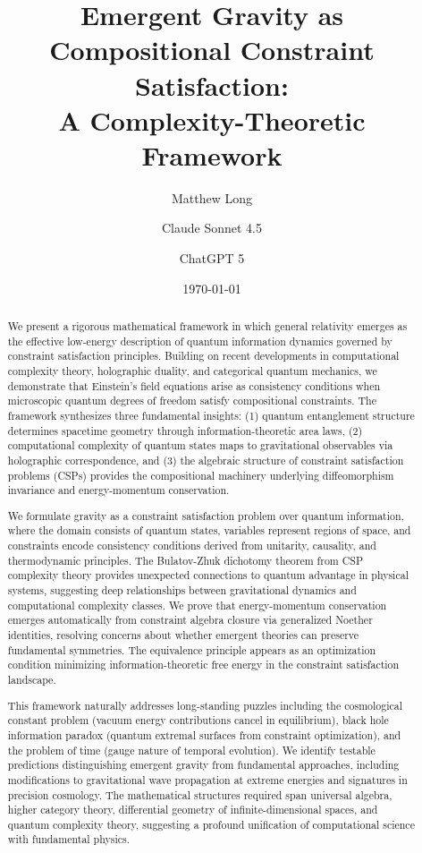\documentclass[11pt,a4paper]{article}
\title{\textbf{Emergent Gravity as Compositional Constraint Satisfaction: \\ A Complexity-Theoretic Framework}}
\author[1]{Matthew Long}
\author[2]{Claude Sonnet 4.5}
\author[3]{ChatGPT 5}
\affil[1]{YonedaAI}
\affil[2]{Anthropic}
\affil[3]{OpenAI}
\date{\today}
\theoremstyle{remark}
\theoremstyle{definition}
\begin{document}
\maketitle

\begin{abstract}
We present a rigorous mathematical framework in which general relativity emerges as the effective low-energy description of quantum information dynamics governed by constraint satisfaction principles. Building on recent developments in computational complexity theory, holographic duality, and categorical quantum mechanics, we demonstrate that Einstein's field equations arise as consistency conditions when microscopic quantum degrees of freedom satisfy compositional constraints. The framework synthesizes three fundamental insights: (1) quantum entanglement structure determines spacetime geometry through information-theoretic area laws, (2) computational complexity of quantum states maps to gravitational observables via holographic correspondence, and (3) the algebraic structure of constraint satisfaction problems (CSPs) provides the compositional machinery underlying diffeomorphism invariance and energy-momentum conservation.

We formulate gravity as a constraint satisfaction problem over quantum information, where the domain consists of quantum states, variables represent regions of space, and constraints encode consistency conditions derived from unitarity, causality, and thermodynamic principles. The Bulatov-Zhuk dichotomy theorem from CSP complexity theory provides unexpected connections to quantum advantage in physical systems, suggesting deep relationships between gravitational dynamics and computational complexity classes. We prove that energy-momentum conservation emerges automatically from constraint algebra closure via generalized Noether identities, resolving concerns about whether emergent theories can preserve fundamental symmetries. The equivalence principle appears as an optimization condition minimizing information-theoretic free energy in the constraint satisfaction landscape.

This framework naturally addresses long-standing puzzles including the cosmological constant problem (vacuum energy contributions cancel in equilibrium), black hole information paradox (quantum extremal surfaces from constraint optimization), and the problem of time (gauge nature of temporal evolution). We identify testable predictions distinguishing emergent gravity from fundamental approaches, including modifications to gravitational wave propagation at extreme energies and signatures in precision cosmology. The mathematical structures required span universal algebra, higher category theory, differential geometry of infinite-dimensional spaces, and quantum complexity theory, suggesting a profound unification of computational science with fundamental physics.
\end{abstract}
\end{document}
